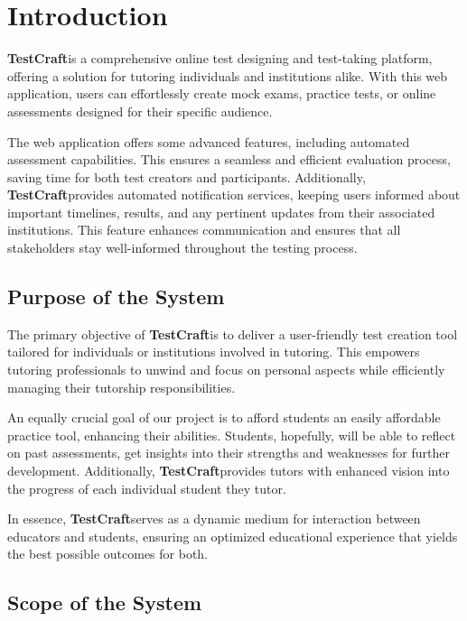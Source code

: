 \documentclass[11pt]{article}
\newcommand{\projectTitle}{\textbf{TestCraft}} %
\begin{document}
\tableofcontents
\newpage

\section{Introduction}
\projectTitle \space is a comprehensive online test designing and test-taking platform,
offering a solution for tutoring individuals and institutions alike. With
this web application, users can effortlessly create mock exams, practice tests,
or online assessments designed for their specific audience.

The web application offers some advanced features, including automated
assessment capabilities. This ensures a seamless and efficient evaluation process, saving time for both test creators
and participants. Additionally, \projectTitle \space provides automated notification
services, keeping users informed about important timelines, results, and
any pertinent updates from their associated institutions. This feature enhances
communication and ensures that all stakeholders stay well-informed
throughout the testing process.

    \subsection{Purpose of the System}
    The primary objective of \projectTitle \space is to deliver a user-friendly test creation
    tool tailored for individuals or institutions involved in tutoring. This
    empowers tutoring professionals to unwind and focus on personal aspects
    while efficiently managing their tutorship responsibilities.

    An equally crucial goal of our project is to afford students an easily affordable
    practice tool, enhancing their abilities. Students, hopefully, will be able to reflect on past assessments, get insights into their strengths and
    weaknesses for further development. Additionally, \projectTitle \space provides tutors
    with enhanced vision into the progress of each individual student they
    tutor.

    In essence, \projectTitle \space serves as a dynamic medium for interaction between
    educators and students, ensuring an optimized educational experience
    that yields the best possible outcomes for both.

    \subsection{Scope of the System}
\end{document}
